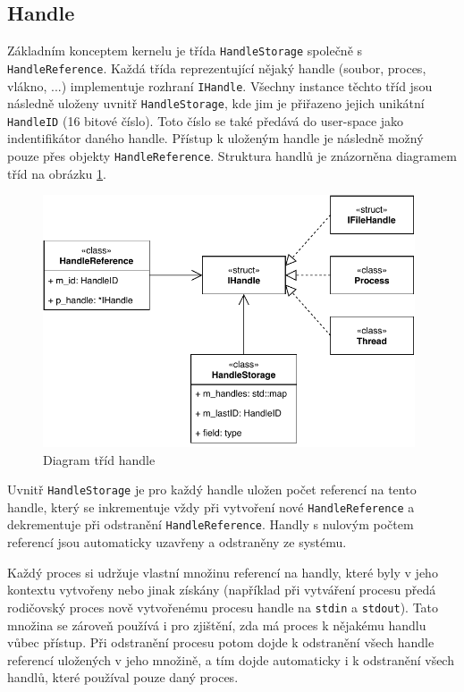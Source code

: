 \documentclass[11pt,a4paper]{scrartcl}
\begin{document}
	\subsection{Handle}
	
	Základním konceptem kernelu je třída \verb|HandleStorage| společně s \verb|HandleReference|. Každá třída reprezentující nějaký handle (soubor, proces, vlákno, ...) implementuje rozhraní \verb|IHandle|. Všechny instance těchto tříd jsou následně uloženy uvnitř \verb|HandleStorage|, kde jim je přiřazeno jejich unikátní \verb|HandleID| (16 bitové číslo). Toto číslo se také předává do user-space jako indentifikátor daného handle. Přístup k uloženým handle je následně možný pouze přes objekty \verb|HandleReference|. Struktura handlů je znázorněna diagramem tříd na obrázku \ref{fig:handle-class-d}.
	
	\begin{figure}[H]
		\centering
		\includegraphics[width=11cm]{handle-class-d.pdf}
		\caption{Diagram tříd handle}
		\label{fig:handle-class-d}
	\end{figure}
	
	Uvnitř \verb|HandleStorage| je pro každý handle uložen počet referencí na tento handle, který se inkrementuje vždy při vytvoření nové \verb|HandleReference| a dekrementuje při odstranění \verb|HandleReference|. Handly s nulovým počtem referencí jsou automaticky uzavřeny a odstraněny ze systému. 
	
	Každý proces si udržuje vlastní množinu referencí na handly, které byly v jeho kontextu vytvořeny nebo jinak získány (například při vytváření procesu předá rodičovský proces nově vytvořenému procesu handle na \verb|stdin| a \verb|stdout|). Tato množina se zároveň používá i pro zjištění, zda má proces k nějakému handlu vůbec přístup. Při odstranění procesu potom dojde k odstranění všech handle referencí uložených v jeho množině, a tím dojde automaticky i k odstranění všech handlů, které používal pouze daný proces. 
	
\end{document}
